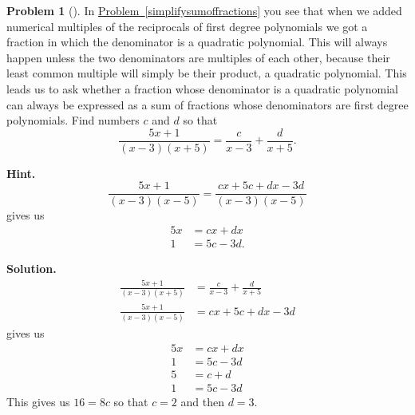 \documentclass[10pt,]{book}
\theoremstyle{plain}
\theoremstyle{definition}
\newtheorem{activity}[project]{Problem}
\theoremstyle{definition}
\numberwithin{equation}{chapter}
\newcommand{\amp}{&}
\begin{document}
\begin{activity}[]\label{partialfractionsintro}
In \hyperref[simplifysumoffractions]{Problem~\ref{simplifysumoffractions}} you see that when we added numerical multiples of the reciprocals of first degree polynomials we got a fraction in which the denominator is a quadratic polynomial. This will always happen unless the two denominators are multiples of each other, because their least common multiple will simply be their product, a quadratic polynomial. This leads us to ask whether a fraction whose denominator is a quadratic polynomial can always be expressed as a sum of fractions whose denominators are first degree polynomials. Find numbers \(c\) and \(d\) so that%
\begin{equation*}
\frac{5x+1}{(x-3)(x+5)} = \frac{c}{x-3} + \frac{d}{x+5}.
\end{equation*}
%
\par\medskip\noindent%
\textbf{Hint.}\quad %
\begin{equation*}
\frac{5x+1}{(x-3)(x-5)} = \frac{cx+5c+dx-3d}{(x-3)(x-5)}
\end{equation*}
gives us%
\begin{align*}
5x \amp = cx+dx\\
1 \amp= 5c-3d\text{.}
\end{align*}
%
\par\medskip\noindent%
\textbf{Solution.}\quad %
\begin{align*}
\frac{5x+1}{(x-3)(x+5)}  \amp=  \frac{c}{x-3} + \frac{d}{x+5}\\
\frac{5x+1}{(x-3)(x-5)}  \amp= cx+5c+dx-3d
\end{align*}
gives us%
\begin{align*}
5x \amp= cx+dx\\
1 \amp= 5c-3d\\
5 \amp= c+d\\
1 \amp= 5c-3d
\end{align*}
This gives us \(16=8c\) so that \(c=2\) and then \(d=3\).%
\end{activity}
\end{document}
